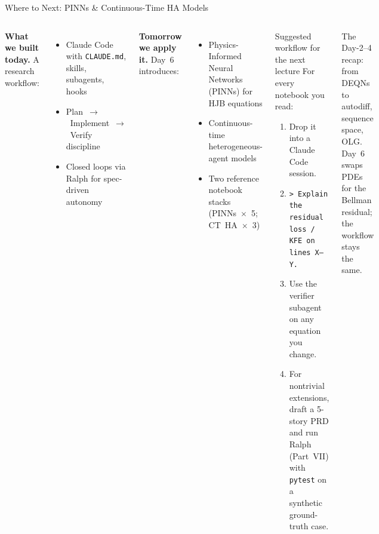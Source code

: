 \documentclass[aspectratio=169,10pt]{beamer}
\newcommand{\emphc}[1]{\textcolor{harvardcrimson}{#1}}
\begin{document}
\begin{frame}{Where to Next: PINNs \& Continuous-Time HA Models}
\small
\begin{columns}[T]
\textbf{What we built today.} A research workflow:
\begin{itemize}\itemsep0pt
    \item Claude Code with \texttt{CLAUDE.md}, skills, subagents, hooks
    \item Plan~$\to$~Implement~$\to$~Verify discipline
    \item \emphc{Closed loops} via Ralph for spec-driven autonomy
\end{itemize}

\vspace{0.4em}
\textbf{Tomorrow we apply it.} Day~6 introduces:
\begin{itemize}\itemsep0pt
    \item \emphc{Physics-Informed Neural Networks} (PINNs) for HJB equations
    \item Continuous-time \emphc{heterogeneous-agent} models
    \item Two reference notebook stacks (PINNs~$\times$~5; CT~HA~$\times$~3)
\end{itemize}

\begin{block}{Suggested workflow for the next lecture}
\scriptsize
For every notebook you read:
\begin{enumerate}\itemsep0pt
  \item Drop it into a Claude Code session.
  \item \texttt{> Explain the residual loss / KFE on lines~X--Y.}
  \item Use the \emphc{verifier} subagent on any equation you change.
  \item For nontrivial extensions, draft a 5-story PRD and run Ralph
        (Part~VII) with \texttt{pytest} on a synthetic ground-truth case.
\end{enumerate}
\end{block}

\vspace{0.3em}
{\scriptsize The \emphc{Day-2--4 recap}: from DEQNs to autodiff, sequence space, OLG.
Day~6 swaps PDEs for the Bellman residual; the workflow stays the same.}
\end{columns}
\end{frame}
\end{document}
